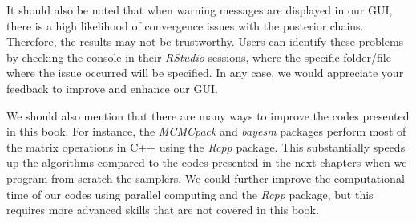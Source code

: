 It should also be noted that when warning messages are displayed in our GUI, there is a high likelihood of convergence issues with the posterior chains. Therefore, the results may not be trustworthy. Users can identify these problems by checking the console in their \textit{RStudio} sessions, where the specific folder/file where the issue occurred will be specified. In any case, we would appreciate your feedback to improve and enhance our GUI.

We should also mention that there are many ways to improve the codes presented in this book. For instance, the \textit{MCMCpack} and \textit{bayesm} packages perform most of the matrix operations in C++ using the \textit{Rcpp} package. This substantially speeds up the algorithms compared to the codes presented in the next chapters when we program from scratch the samplers. We could further improve the computational time of our codes using parallel computing and the \textit{Rcpp} package, but this requires more advanced skills that are not covered in this book.